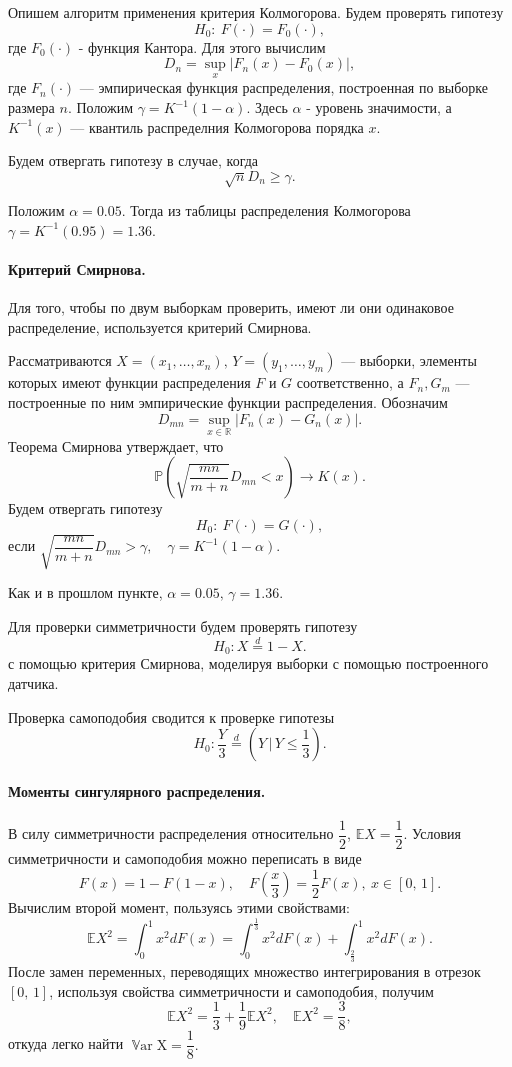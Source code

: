 \documentclass[16pt]{article}
\DeclareMathOperator*{\Var}{\mathbb{V}ar}
\begin{document}
Опишем алгоритм применения {критерия Колмогорова}. Будем проверять гипотезу
$$H_0\colon \ F(\cdot) = F_0(\cdot),$$
где $F_0(\cdot)$ - функция Кантора. Для этого вычислим
$$D_n = \sup_x|F_n(x) - F_0(x)|,$$
где $F_n(\cdot)$ --- эмпирическая функция распределения, построенная по выборке размера $n$. Положим $\gamma = K^{-1}(1-\alpha)$. Здесь $\alpha$ - уровень значимости, а $K^{-1}(x)$ --- квантиль распределния Колмогорова порядка $x$. 

Будем отвергать гипотезу в случае, когда
$$\sqrt{n}D_n \geq \gamma.$$

Положим $\alpha = 0.05$. Тогда из таблицы распределения Колмогорова $\gamma = K^{-1}(0.95) = 1.36$.

\paragraph{Критерий Смирнова.} Для того, чтобы по двум выборкам проверить, имеют ли они одинаковое распределение, используется {критерий Смирнова}. 

Рассматриваются $X = (x_1, \ldots, x_n),\, Y = (y_1, \ldots, y_m)$ --- выборки, элементы которых имеют функции распределения $F$ и $G$ соответственно, а $F_n, G_m$ --- построенные по ним эмпирические функции распределения. Обозначим 
$$D_{mn} = \sup_{x \in \mathbb{R}}|F_n(x) - G_n(x)|.$$
Теорема Смирнова \cite{Smir} утверждает, что
$$\mathbb{P}\left(\sqrt{\frac{mn}{m+n}}D_{mn} < x\right) \to K(x).$$
Будем отвергать гипотезу
$$H_0\colon \ F(\cdot) = G(\cdot),$$
если 
$\sqrt{\dfrac{mn}{m+n}}D_{mn} > \gamma, \quad \gamma = K^{-1}(1 - \alpha).$

Как и в прошлом пункте, $\alpha = 0.05,\, \gamma = 1.36$.

Для проверки симметричности будем проверять гипотезу
$$H_0\colon X \overset{d}{=} 1 - X.$$
с помощью критерия Смирнова, моделируя выборки с помощью построенного датчика.

Проверка самоподобия сводится к проверке гипотезы
$$H_0\colon \dfrac{Y}{3} \overset{d}{=} \left(Y \, \bigg| \, Y \leq \dfrac13\right).$$

\paragraph{Моменты сингулярного распределения.}
В силу симметричности распределения относительно $\dfrac12$, $\mathbb{E}X = \dfrac12$.
Условия симметричности и самоподобия можно переписать в виде
$$F(x) = 1 - F(1 - x), \quad F\left(\frac{x}{3}\right) = \frac12 F(x), \ x \in [0, \, 1].$$
Вычислим второй момент, пользуясь этими свойствами:
$$\mathbb{E}X^2 = \int_0^1x^2dF(x) = \int_0^{\frac13}x^2dF(x)+\int_\frac23^1 x^2dF(x).$$
После замен переменных, переводящих множество интегрирования в отрезок $[0,\, 1]$, используя свойства симметричности и самоподобия, получим
$$\mathbb{E}X^2 = \frac13 + \frac19\mathbb{E}X^2, \quad \mathbb{E}X^2 = \frac38,$$
откуда легко найти $\Var \mathrm{X} = \dfrac18.$
\end{document}
